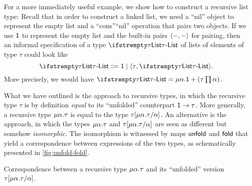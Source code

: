 For a more immediately useful example, we show how to construct a recursive list type: Recall that in order to construct a linked list, we need a \enquote{nil} object to represent the empty list and a \enquote{cons}\enquote{nil} operation that pairs two objects. If we use $\mathsf{1}$ to represent the empty list and the built-in pairs $\langle\textcolor{black}{{-}},\textcolor{black}{{-}}\rangle$ for pairing, then an informal specification of a type $\typeList[\tau]$ of lists of elements of type $\tau$ could look like
%
\begin{equation*}
    \typeList[\tau]
        \Coloneqq \expUnit \mid \expPair{\tau}{\typeList[\tau]}.
\end{equation*}
%
More precisely, we would have $\typeList[\tau] = \typeRec{\alpha}{\typeSum{\typeUnit}{\typeProd*{\tau}{\alpha}}}$.

What we have outlined is the  approach to recursive types, in which the recursive type $\tau$ is by definition \emph{equal} to its \enquote{unfolded} counterpart $\typeFunc{\typeUnit}{\tau}$. More generally, a recursive type $\typeRec{\alpha}{\tau}$ is equal to the type $\tau[\typeRec{\alpha}{\tau}/\alpha]$. An alternative is the  approach, in which the types $\typeRec{\alpha}{\tau}$ and $\tau[\typeRec{\alpha}{\tau}/\alpha]$ are seen as different but somehow \emph{isomorphic}. The isomorphism is witnessed by maps $\mathsf{unfold}$ and $\mathsf{fold}$ that yield a correspondence between expressions of the two types, as schematically presented in \cref{fig:unfold-fold}.

\begin{marginfigure}\small
    \caption{Correspondence between a recursive type $\protect\typeRec{\alpha}{\tau}$ and its \enquote{unfolded} version $\tau[\protect\typeRec{\alpha}{\tau}/\alpha]$.}
    \label{fig:unfold-fold}
\end{marginfigure}

\newcommand{\expNil}{\expr{nil}}
\newcommand{\expCons}{\expr{cons}}

